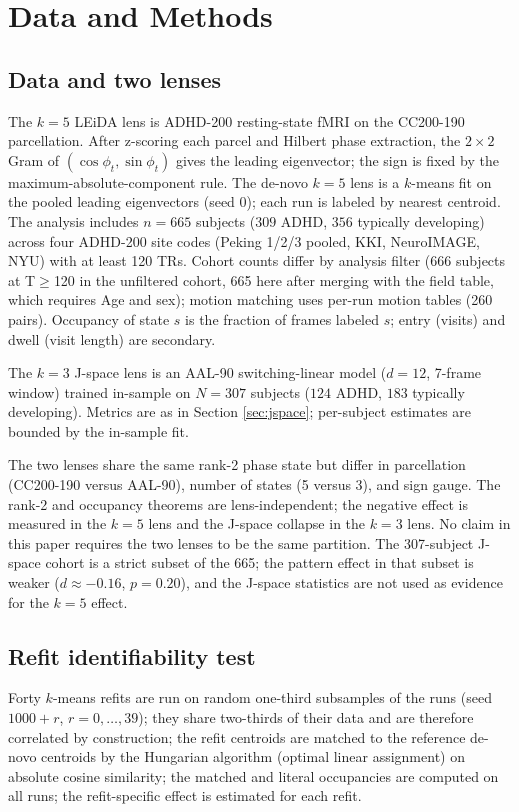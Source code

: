 \documentclass[11pt]{article}
\theoremstyle{definition}
\begin{document}
\section{Data and Methods}
\label{sec:methods}

\subsection{Data and two lenses}
The $k=5$ LEiDA lens is ADHD-200 resting-state fMRI \cite{ADHD2002012} on the CC200-190
parcellation. After z-scoring each parcel and Hilbert phase extraction, the $2\times2$
Gram of $(\cos\phi_t,\sin\phi_t)$ gives the leading eigenvector; the sign is fixed by
the maximum-absolute-component rule. The de-novo $k=5$ lens is a $k$-means fit on the
pooled leading eigenvectors (seed 0); each run is labeled by nearest centroid. The
analysis includes $n=665$ subjects ($309$ ADHD, $356$ typically developing) across
four ADHD-200 site codes (Peking 1/2/3 pooled, KKI, NeuroIMAGE, NYU) with at least 120
TRs. Cohort counts differ by analysis filter (666 subjects at T$\ge$120 in the unfiltered cohort,
665 here after merging with the field table, which requires Age and sex); motion matching
uses per-run motion tables (260 pairs). Occupancy
of state $s$ is the fraction of frames labeled $s$; entry (visits) and dwell (visit length) are secondary.

The $k=3$ J-space lens is an AAL-90 switching-linear model ($d=12$, 7-frame window) trained
in-sample on $N=307$ subjects ($124$ ADHD, $183$ typically developing). Metrics are as in
Section \ref{sec:jspace}; per-subject estimates are bounded by the in-sample fit.

The two lenses share the same rank-2 phase state but differ in parcellation (CC200-190
versus AAL-90), number of states (5 versus 3), and sign gauge. The rank-2 and occupancy
theorems are lens-independent; the negative effect is measured in the $k=5$ lens and
the J-space collapse in the $k=3$ lens. No claim in this paper requires the two lenses
to be the same partition. The 307-subject J-space cohort is a strict subset of the 665;
the pattern effect in that subset is weaker ($d\approx-0.16$, $p=0.20$), and the J-space
statistics are not used as evidence for the $k=5$ effect.

\subsection{Refit identifiability test}
Forty $k$-means refits are run on random one-third subsamples of the runs (seed
$1000+r$, $r=0,\dots,39$); they share two-thirds of their data and are therefore
correlated by construction; the refit centroids are matched to the reference
de-novo centroids by the Hungarian algorithm (optimal linear assignment) on absolute cosine similarity; the matched
and literal occupancies are computed on all runs; the refit-specific effect is estimated
for each refit.
\end{document}

